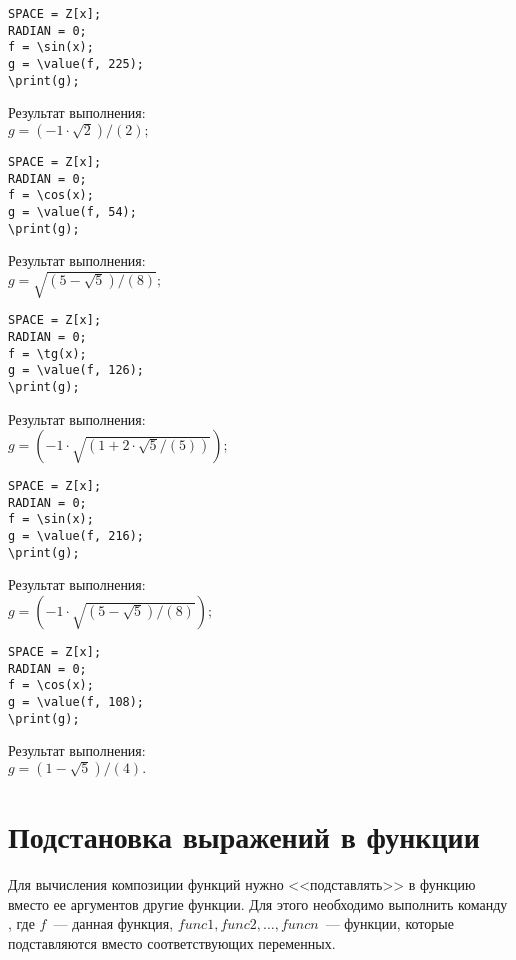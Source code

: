 \begin{verbatim}
SPACE = Z[x];
RADIAN = 0;
f = \sin(x);
g = \value(f, 225);
\print(g);
\end{verbatim}
\vspace*{-2mm}


Результат выполнения:\\
$g = (-1\cdot \sqrt{2})/(2);$

\begin{verbatim}
SPACE = Z[x];
RADIAN = 0;
f = \cos(x);
g = \value(f, 54);
\print(g);
\end{verbatim}

Результат выполнения:\\
$g = \sqrt{(5-\sqrt{5})/(8)};$

\begin{verbatim}
SPACE = Z[x];
RADIAN = 0;
f = \tg(x);
g = \value(f, 126);
\print(g);
\end{verbatim}
\vspace*{-2mm}


Результат выполнения: \\
$g = (-1\cdot \sqrt{(1+2\cdot \sqrt{5}/(5))});$

\begin{verbatim}
SPACE = Z[x];
RADIAN = 0;
f = \sin(x);
g = \value(f, 216);
\print(g);
\end{verbatim}

Результат выполнения: \\
$g = (-1\cdot \sqrt{(5-\sqrt{5})/(8)});$

\begin{verbatim}
SPACE = Z[x];
RADIAN = 0;
f = \cos(x);
g = \value(f, 108);
\print(g);
\end{verbatim}
\vspace*{-2mm}


Результат выполнения:\\
$g = (1-\sqrt{5})/(4). $

\section{Подстановка выражений в функции}

Для вычисления композиции функций нужно <<подставлять>> в функцию вместо ее аргументов другие функции.  Для этого
необходимо выполнить команду   ,  где $f$~--- данная функция,  
$func1, func2,\ldots, funcn$~--- функции,  которые подставляются вместо соответствующих переменных. 
\smallskip

